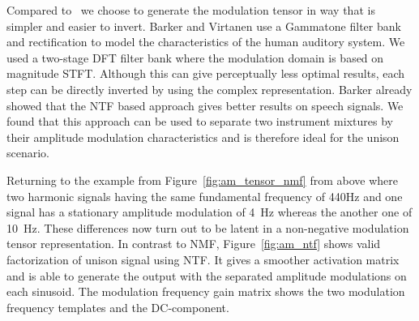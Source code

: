 %
%
\par
Compared to~\cite{barker13} we choose to generate the modulation tensor in way that is simpler and easier to invert. Barker and Virtanen use a Gammatone filter bank and rectification to model the characteristics of the human auditory system. We used a two-stage DFT filter bank where the modulation domain is based on magnitude STFT. Although this can give perceptually less optimal results, each step can be directly inverted by using the complex representation. Barker already showed that the NTF based approach gives better results on speech signals. We found that this approach can be used to separate two instrument mixtures by their amplitude modulation characteristics and is therefore ideal for the unison scenario.
\par
Returning to the example from Figure~\ref{fig:am_tensor_nmf} from above where two harmonic signals having the same fundamental frequency of 440Hz and one signal has a stationary amplitude modulation of 4~Hz whereas the another one of 10~Hz. 
These differences now turn out to be latent in a non-negative modulation tensor representation.
In contrast to NMF, Figure~\ref{fig:am_ntf} shows valid factorization of unison signal using NTF.
It gives a smoother activation matrix and is able to generate the output with the separated amplitude modulations on each sinusoid. The modulation frequency gain matrix shows the two modulation frequency templates and the DC-component.

